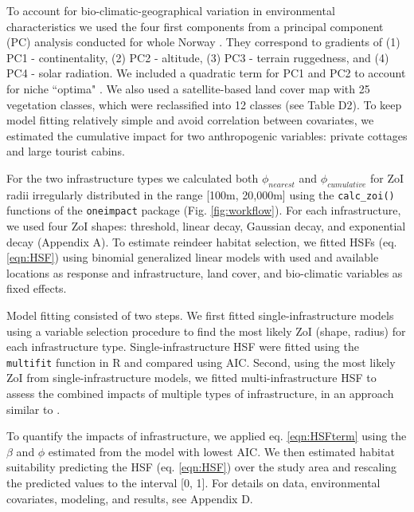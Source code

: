 \documentclass[titlepage]{article}
\begin{document}
To account for bio-climatic-geographical variation in environmental characteristics we used the four first components from a principal component (PC) analysis conducted for whole Norway \citep{bakkestuen_step-less_2008}. They correspond to gradients of (1) PC1 - continentality, (2) PC2 - altitude, (3) PC3 - terrain ruggedness, and (4) PC4 - solar radiation. We included a quadratic term for PC1 and PC2 to account for niche ``optima" \citep[\textit{sensu}][]{panzacchi_searching_2015}. We also used a satellite-based land cover map with 25 vegetation classes, which were reclassified into 12 classes (see Table D2). To keep model fitting relatively simple and avoid correlation between covariates, we estimated the cumulative impact for two anthropogenic variables: private cottages and large tourist cabins.

For the two infrastructure types we calculated both $\phi_{nearest}$ and $\phi_{cumulative}$ for ZoI radii irregularly distributed in the range [100m, 20,000m] using the \verb|calc_zoi()| functions of the \verb|oneimpact| package (Fig. \ref{fig:workflow}). For each infrastructure, we used four ZoI shapes: threshold, linear decay, Gaussian decay, and exponential decay (Appendix A). To estimate reindeer habitat selection, we fitted HSFs (eq. \ref{eqn:HSF}) using binomial generalized linear models \citep{fieberg_how_2021} with used and available locations as response and infrastructure, land cover, and bio-climatic variables as fixed effects. 

Model fitting consisted of two steps. We first fitted single-infrastructure models using a variable selection procedure \citep{burnham_model_2002} to find the most likely ZoI (shape, radius) for each infrastructure type. Single-infrastructure HSF were fitted using the \verb|multifit| function in R \citep{huais_multifit_2018} and compared using AIC. Second, using the most likely ZoI from single-infrastructure models, we fitted multi-infrastructure HSF to assess the combined impacts of multiple types of infrastructure, in an approach similar to \citet{laforge_process-focussed_2015}. 

To quantify the impacts of infrastructure, we applied eq. \ref{eqn:HSFterm} using the $\beta$ and $\phi$ estimated from the model with lowest AIC. We then estimated habitat suitability predicting the HSF (eq. \ref{eqn:HSF}) over the study area and rescaling the predicted values to the interval [0, 1]. For details on data, environmental covariates, modeling, and results, see Appendix D.
\end{document}
